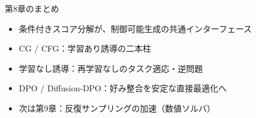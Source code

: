 \asmain
\begin{frame}{第8章のまとめ}
    \begin{itemize}
        \item 条件付きスコア分解が、制御可能生成の共通インターフェース
        \item CG / CFG：学習あり誘導の二本柱
        \item 学習なし誘導：再学習なしのタスク適応・逆問題
        \item DPO / Diffusion-DPO：好み整合を安定な直接最適化へ
        \item 次は第9章：反復サンプリングの加速（数値ソルバ）
    \end{itemize}
\end{frame}
